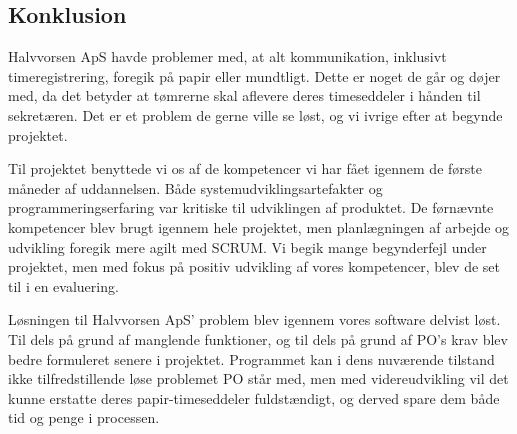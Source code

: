\subsection{Konklusion}
Halvvorsen ApS havde problemer med, at alt kommunikation, inklusivt timeregistrering, foregik på papir eller mundtligt. 
Dette er noget de går og døjer med, da det betyder at tømrerne skal aflevere deres timeseddeler i hånden til sekretæren.
Det er et problem de gerne ville se løst, og vi ivrige efter at begynde projektet. 

Til projektet benyttede vi os af de kompetencer vi har fået igennem de første måneder af uddannelsen.
Både systemudviklingsartefakter og programmeringserfaring var kritiske til udviklingen af produktet. 
De førnævnte kompetencer blev brugt igennem hele projektet, men planlægningen af arbejde og udvikling foregik mere agilt med SCRUM.
Vi begik mange begynderfejl under projektet, men med fokus på positiv udvikling af vores kompetencer, blev de set til i en evaluering.
 
Løsningen til Halvvorsen ApS' problem blev igennem vores software delvist løst. 
Til dels på grund af manglende funktioner, og til dels på grund af PO's krav blev bedre formuleret senere i projektet.
Programmet kan i dens nuværende tilstand ikke tilfredstillende løse problemet PO står med, men med videreudvikling vil det kunne erstatte deres papir-timeseddeler fuldstændigt, og derved spare dem både tid og penge i processen.